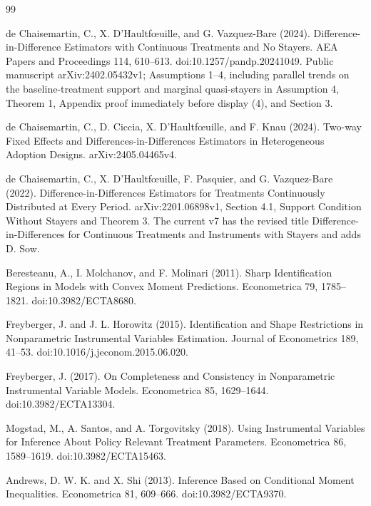 \documentclass{article}
\begin{document}
\begin{thebibliography}{99}

   de Chaisemartin, C., X. D'Haultf\oe{}uille, and G. Vazquez-Bare (2024). Difference-in-Difference Estimators with Continuous Treatments and No Stayers. AEA Papers and Proceedings 114, 610--613. doi:10.1257/pandp.20241049. Public manuscript arXiv:2402.05432v1; Assumptions 1--4, including parallel trends on the baseline-treatment support and marginal quasi-stayers in Assumption 4, Theorem 1, Appendix proof immediately before display (4), and Section 3.

   de Chaisemartin, C., D. Ciccia, X. D'Haultf\oe{}uille, and F. Knau (2024). Two-way Fixed Effects and Differences-in-Differences Estimators in Heterogeneous Adoption Designs. arXiv:2405.04465v4.

   de Chaisemartin, C., X. D'Haultf\oe{}uille, F. Pasquier, and G. Vazquez-Bare (2022). Difference-in-Differences Estimators for Treatments Continuously Distributed at Every Period. arXiv:2201.06898v1, Section 4.1, Support Condition Without Stayers and Theorem 3. The current v7 has the revised title Difference-in-Differences for Continuous Treatments and Instruments with Stayers and adds D. Sow.

   Beresteanu, A., I. Molchanov, and F. Molinari (2011). Sharp Identification Regions in Models with Convex Moment Predictions. Econometrica 79, 1785--1821. doi:10.3982/ECTA8680.

   Freyberger, J. and J. L. Horowitz (2015). Identification and Shape Restrictions in Nonparametric Instrumental Variables Estimation. Journal of Econometrics 189, 41--53. doi:10.1016/j.jeconom.2015.06.020.

   Freyberger, J. (2017). On Completeness and Consistency in Nonparametric Instrumental Variable Models. Econometrica 85, 1629--1644. doi:10.3982/ECTA13304.

   Mogstad, M., A. Santos, and A. Torgovitsky (2018). Using Instrumental Variables for Inference About Policy Relevant Treatment Parameters. Econometrica 86, 1589--1619. doi:10.3982/ECTA15463.

   Andrews, D. W. K. and X. Shi (2013). Inference Based on Conditional Moment Inequalities. Econometrica 81, 609--666. doi:10.3982/ECTA9370.


\end{thebibliography}
\end{document}
